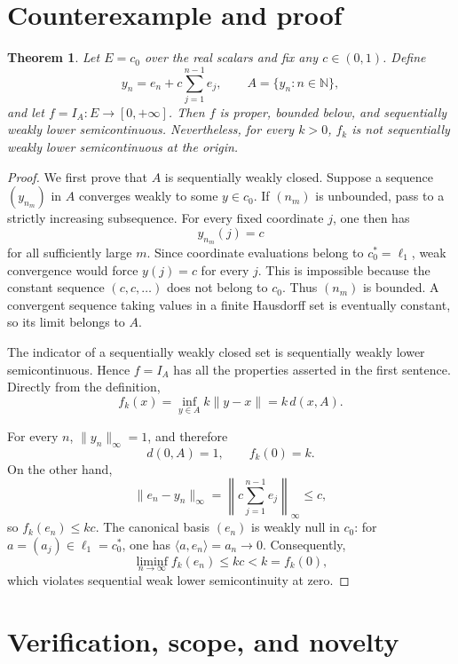 \documentclass[11pt]{article}
\newtheorem{theorem}{Theorem}
\newcommand{\N}{\mathbb N}
\begin{document}
\section{Counterexample and proof}

\begin{theorem}\label{thm:counterexample}
Let $E=c_0$ over the real scalars and fix any $c\in(0,1)$.  Define
\[
 y_n=e_n+c\sum_{j=1}^{n-1}e_j,
 \qquad A=\{y_n:n\in\N\},
\]
and let $f=I_A:E\to[0,+\infty]$.  Then $f$ is proper, bounded below, and
sequentially weakly lower semicontinuous.  Nevertheless, for every $k>0$,
$f_k$ is not sequentially weakly lower semicontinuous at the origin.
\end{theorem}

\begin{proof}
We first prove that $A$ is sequentially weakly closed.  Suppose a sequence
$(y_{n_m})$ in $A$ converges weakly to some $y\in c_0$.  If $(n_m)$ is
unbounded, pass to a strictly increasing subsequence.  For every fixed
coordinate $j$, one then has
\[
 y_{n_m}(j)=c
\]
for all sufficiently large $m$.  Since coordinate evaluations belong to
$c_0^*=\ell_1$, weak convergence would force $y(j)=c$ for every $j$.  This is
impossible because the constant sequence $(c,c,\ldots)$ does not belong to
$c_0$.  Thus $(n_m)$ is bounded.  A convergent sequence taking values in a
finite Hausdorff set is eventually constant, so its limit belongs to $A$.

The indicator of a sequentially weakly closed set is sequentially weakly
lower semicontinuous.  Hence $f=I_A$ has all the properties asserted in the
first sentence.  Directly from the definition,
\begin{equation}\label{eq:distance}
 f_k(x)=\inf_{y\in A}k\|y-x\|=k\,d(x,A).
\end{equation}

For every $n$, $\|y_n\|_\infty=1$, and therefore
\[
 d(0,A)=1,
 \qquad f_k(0)=k.
\]
On the other hand,
\[
 \|e_n-y_n\|_\infty
 =\left\|c\sum_{j=1}^{n-1}e_j\right\|_\infty\le c,
\]
so $f_k(e_n)\le kc$.  The canonical basis $(e_n)$ is weakly null in $c_0$:
for $a=(a_j)\in\ell_1=c_0^*$, one has $\langle a,e_n\rangle=a_n\to0$.
Consequently,
\[
 \liminf_{n\to\infty} f_k(e_n)\le kc<k=f_k(0),
\]
which violates sequential weak lower semicontinuity at zero.
\end{proof}

\section{Verification, scope, and novelty}
\end{document}
